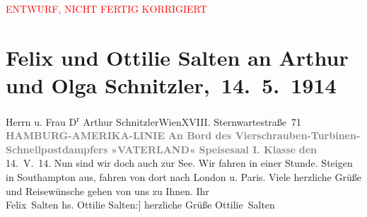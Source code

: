 
\begin{center}
            \textcolor{red}{ENTWURF, NICHT FERTIG KORRIGIERT}
                      \end{center}
            
         
         \renewcommand{\erwaehntePersonen}{Personen: Olga Schnitzler}
         \renewcommand{\erwaehnteInstitutionen}{Institutionen: Hamburg-Amerika-Linie, Schnellpostdampfer Vaterland}
         \renewcommand{\erwaehnteOrte}{Orte: Cuxhaven, London, Nordsee, Paris, Southampton, Sternwartestraße 71, Wien}
         \renewcommand{\erwaehnteWerke}{}
               \section[ Felix und Ottilie Salten an Arthur und Olga Schnitzler, 14. 5. 1914]{ Felix und Ottilie Salten an Arthur und Olga
               Schnitzler, 14. 5. 1914}\nopagebreak{}\rehead{ }\begin{ledgroupsized}[t]{13cm}\normalsize\beginnumbering \toendnotes[C]{\smallbreak\pagebreak[2]} 
\toendnotes[C]{\smallbreak}\pstart{}{\pb}Herrn u. Frau D\textsuperscript{r} Arthur Schnitzler\pend{}\pstart{}Wien\pend{}\pstart{}XVIII. Sternwartestraße 71\pend{}{\bigskip}\pstart
           \noindent{}{\pb}\textcolor{gray}{\textbf{HAMBURG-AMERIKA-LINIE}}\pend
           \pstart
           \textcolor{gray}{\textbf{An Bord des Vierschrauben-Turbinen-Schnellpostdampfers}}\pend
           \pstart
           \textcolor{gray}{\textbf{»VATERLAND«}}\pend
           \pstart
           \textcolor{gray}{\textbf{Speisesaal I. Klasse}}\pend
           \pstart
           {\pb}\textcolor{gray}{\textbf{den}}{ }14. V. 14.\pend
           \pstart
           Nun sind wir doch auch zur See. Wir fahren in einer Stunde. Steigen in Southampton aus, fahren von dort nach London u. Paris. Viele herzliche Grüße
               und Reisewünsche gehen von uns zu Ihnen. Ihr {\\}\spacefill\mbox{Felix Salten}\pend
           \pstart
           \noindent{}{[}hs. Ottilie Salten:{]} herzliche Grüße\pend
           \pstart \spacefill\mbox{Ottilie Salten}\pend{}
         

\end{ledgroupsized}
